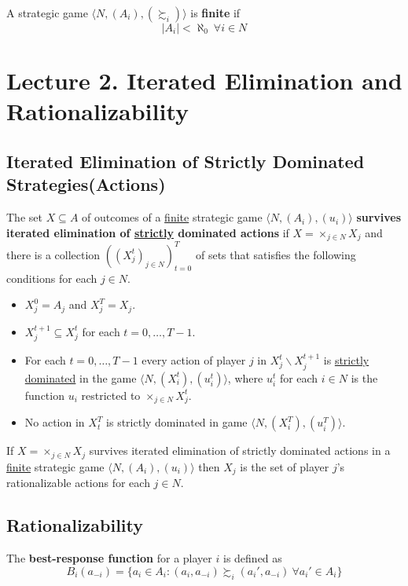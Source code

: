 \documentclass[11pt]{article}
\begin{document}
		\begin{definition}[pg.11]
			A strategic game $\langle N, (A_i), (\succsim_i) \rangle$ is \textbf{finite} if 
			\[
				|A_i| < \aleph_0\ \forall i \in N
			\]
		\end{definition}
		
	\section{Lecture 2. Iterated Elimination and Rationalizability}
		\subsection{Iterated Elimination of Strictly Dominated Strategies(Actions)}
			\begin{definition}[60.2]
				The set $X \subseteq A$ of outcomes of a \ul{finite} strategic game $\langle N, (A_i), (u_i) \rangle$ \textbf{survives iterated elimination of \ul{strictly} dominated actions} if $X = \times_{j \in N} X_j$ and there is a collection $((X_j^t)_{j \in N})_{t=0}^T$ of sets that satisfies the following conditions for each $j \in N$.
				\begin{itemize}
					\item $X_j^0 = A_j$ and $X_j^T = X_j$.
					\item $X_j^{t+1} \subseteq X_j^t$ for each $t = 0, \dots, T - 1$.
					\item For each $t = 0, \dots, T-1$ every action of player $j$ in $X_j^t \backslash X_j^{t+1}$ is \ul{strictly dominated} in the game $\langle N, (X_i^t), (u_i^t) \rangle$, where $u_i^t$ for each $i \in N$ is the function $u_i$ restricted to $\times_{j \in N} X_j^t$.
					\item No action in $X_t^T$ is strictly dominated in game $\langle N, (X_i^T), (u_i^T) \rangle$.
				\end{itemize}
			\end{definition}
			
			\begin{proposition}[61.2]
				If $X = \times_{j \in N}X_j$ survives iterated elimination of strictly dominated actions in a \ul{finite} strategic game $\langle N, (A_i), (u_i) \rangle$ then $X_j$ is the set of player $j$'s rationalizable actions for each $j \in N$.
			\end{proposition}
			
		\subsection{Rationalizability}
			\begin{definition}[pg.15]
				The \textbf{best-response function} for a player $i$ is defined as
				\[
					B_i(a_{-i}) = \{a_i \in A_i : (a_i, a_{-i}) \succsim_i (a_i', a_{-i})\ \forall a_i' \in A_i \}
				\]
			\end{definition}
			
\end{document}
